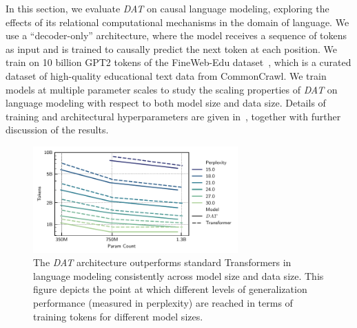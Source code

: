 In this section, we evaluate \textit{DAT} on causal language modeling, exploring the effects of its relational computational mechanisms in the domain of language. We use a ``decoder-only'' architecture, where the model receives a sequence of tokens as input and is trained to causally predict the next token at each position. We train on 10 billion GPT2 tokens of the FineWeb-Edu dataset~\citep{lozhkov2024fineweb-edu}, which is a curated dataset of high-quality educational text data from CommonCrawl. We train models at multiple parameter scales to study the scaling properties of \textit{DAT} on language modeling with respect to both model size and data size. Details of training and architectural hyperparameters are given in~, together with further discussion of the results.

\begin{figure}
    \centering
    \includegraphics[width=0.7\textwidth]{figs/experiments/fineweb/tokens_vs_param_count.pdf}
    \caption{The \textit{DAT} architecture outperforms standard Transformers in language modeling consistently across model size and data size. This figure depicts the point at which different levels of generalization performance (measured in perplexity) are reached in terms of training tokens for different model sizes. }\label{fig:fineweb_param_data}
\end{figure}
%     

%     

